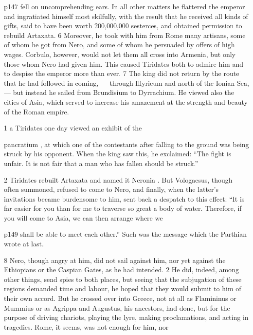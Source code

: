 p147 fell on uncomprehending ears. In all other matters he flattered the emperor and ingratiated himself most skilfully, with the result that he received all kinds of gifts, said to have been worth 200,000,000 sesterces, and obtained permission to rebuild Artaxata. 6 Moreover, he took with him from Rome many artisans, some of whom he got from Nero, and some of whom he persuaded by offers of high wages. Corbulo, however, would not let them all cross into Armenia, but only those whom Nero had given him. This caused Tiridates both to admire him and to despise the emperor more than ever. 7 The king did not return by the route that he had followed in coming, \texthebrew{—} through Illyricum and north of the Ionian Sea, \texthebrew{—} but instead he sailed from Brundisium to Dyrrachium. He viewed also the cities of Asia, which served to increase his amazement at the strength and beauty of the Roman empire.

1 a Tiridates one day viewed an exhibit of the

pancratium , at which one of the contestants after falling to the ground was being struck by his opponent. When the king saw this, he exclaimed: ``The fight is unfair. It is not fair that a man who has fallen should be struck.''

2
Tiridates rebuilt Artaxata and named it Neronia . But Vologaesus, though often summoned, refused to come to Nero, and finally, when the latter's invitations became burdensome to him, sent back a despatch to this effect: ``It is far easier for you than for me to traverse so great a body of water. Therefore, if you will come to Asia, we can then arrange where we

p149 shall be able to meet each other.'' Such was the message which the Parthian wrote at last.

8
Nero, though angry at him, did not sail against him, nor yet against the Ethiopians or the Caspian Gates, as he had intended. 2 He did, indeed, among other things, send spies to both places, but seeing that the subjugation of these regions demanded time and labour, he hoped that they would submit to him of their own accord. But he crossed over into Greece, not at all as Flamininus or Mummius or as Agrippa and Augustus, his ancestors, had done, but for the purpose of driving chariots, playing the lyre, making proclamations, and acting in tragedies. Rome, it seems, was not enough for him, nor

